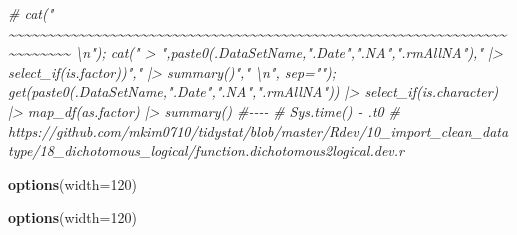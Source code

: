 \documentclass[
]{article}
\newenvironment{Shaded}{\begin{snugshade}}{\end{snugshade}}
\newcommand{\AttributeTok}[1]{\textcolor[rgb]{0.13,0.29,0.53}{#1}}
\newcommand{\CommentTok}[1]{\textcolor[rgb]{0.56,0.35,0.01}{\textit{#1}}}
\newcommand{\DecValTok}[1]{\textcolor[rgb]{0.00,0.00,0.81}{#1}}
\newcommand{\FunctionTok}[1]{\textcolor[rgb]{0.13,0.29,0.53}{\textbf{#1}}}
\newcommand{\NormalTok}[1]{#1}
\begin{document}
\begin{Shaded}
\begin{Highlighting}[]
\CommentTok{\# cat("    \textasciitilde{}\textasciitilde{}\textasciitilde{}\textasciitilde{}\textasciitilde{}\textasciitilde{}\textasciitilde{}\textasciitilde{}\textasciitilde{}\textasciitilde{}\textasciitilde{}\textasciitilde{}\textasciitilde{}\textasciitilde{}\textasciitilde{}\textasciitilde{}\textasciitilde{}\textasciitilde{}\textasciitilde{}\textasciitilde{}\textasciitilde{}\textasciitilde{}\textasciitilde{}\textasciitilde{}\textasciitilde{}\textasciitilde{}\textasciitilde{}\textasciitilde{}\textasciitilde{}\textasciitilde{}\textasciitilde{}\textasciitilde{}\textasciitilde{}\textasciitilde{}\textasciitilde{}\textasciitilde{}\textasciitilde{}\textasciitilde{}\textasciitilde{}\textasciitilde{}\textasciitilde{}\textasciitilde{}\textasciitilde{}\textasciitilde{}\textasciitilde{}\textasciitilde{}\textasciitilde{}\textasciitilde{}\textasciitilde{}\textasciitilde{}\textasciitilde{}\textasciitilde{}\textasciitilde{}\textasciitilde{}\textasciitilde{}\textasciitilde{}\textasciitilde{}\textasciitilde{}\textasciitilde{}\textasciitilde{}\textasciitilde{}\textasciitilde{}\textasciitilde{}\textasciitilde{}\textasciitilde{}\textasciitilde{}\textasciitilde{}\textasciitilde{}\textasciitilde{}\textasciitilde{}\textasciitilde{}\textasciitilde{}    \textbackslash{}n"); cat(" \textgreater{} ",paste0(.DataSetName,".Date",".NA",".rmAllNA")," |\textgreater{} select\_if(is.factor))"," |\textgreater{} summary()","  \textbackslash{}n", sep=""); get(paste0(.DataSetName,".Date",".NA",".rmAllNA")) |\textgreater{} select\_if(is.character) |\textgreater{} map\_df(as.factor) |\textgreater{} summary() \#{-}{-}{-}{-}  }
\CommentTok{\# Sys.time() {-} .t0}
\CommentTok{\# https://github.com/mkim0710/tidystat/blob/master/Rdev/10\_import\_clean\_datatype/18\_dichotomous\_logical/function.dichotomous2logical.dev.r}
\end{Highlighting}
\end{Shaded}

\begin{Shaded}
\begin{Highlighting}[]
\FunctionTok{options}\NormalTok{(}\AttributeTok{width=}\DecValTok{120}\NormalTok{)}
\end{Highlighting}
\end{Shaded}

\begin{Shaded}
\begin{Highlighting}[]
\FunctionTok{options}\NormalTok{(}\AttributeTok{width=}\DecValTok{120}\NormalTok{)}
\end{Highlighting}
\end{Shaded}
\end{document}
